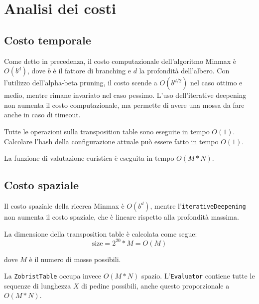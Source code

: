 \section{Analisi dei costi}

\subsection{Costo temporale}

Come detto in precedenza, il costo computazionale dell'algoritmo Minmax è $O(b^d)$, dove $b$ è il fattore di branching e $d$ la profondità dell'albero.
Con l'utilizzo dell'alpha-beta pruning, il costo scende a $O(b^{d/2})$ nel caso ottimo e medio, mentre rimane invariato nel caso pessimo.
L'uso dell'iterative deepening non aumenta il costo computazionale, ma permette di avere una mossa da fare anche in caso di timeout.

Tutte le operazioni sulla transposition table sono eseguite in tempo $O(1)$. Calcolare l'hash della configurazione attuale può essere fatto in tempo $O(1)$.

La funzione di valutazione euristica è eseguita in tempo $O(M*N)$.

\subsection{Costo spaziale}

Il costo spaziale della ricerca Minmax è $O(b^d)$, mentre l'\verb!iterativeDeepening! non aumenta il costo spaziale, che è lineare rispetto alla profondità massima.

La dimensione della transposition table è calcolata come segue:
$$
    \textrm{size} = 2^{20} * M = O(M)
$$

dove $M$ è il numero di mosse possibili.

La \verb!ZobristTable! occupa invece $O(M*N)$ spazio.
L'\verb!Evaluator! contiene tutte le sequenze di lunghezza $X$ di pedine possibili, anche questo proporzionale a $O(M*N)$.